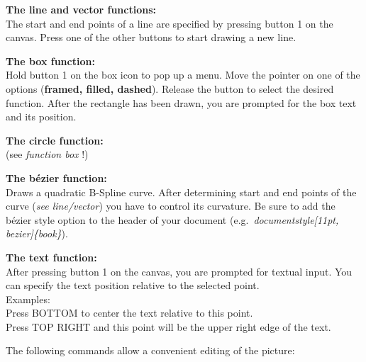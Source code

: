 \begin{description}
  \item{\bf The line and vector functions:} \\
     The start and end points of a line are specified by pressing
     button 1 on the canvas.
     Press one of the other buttons to start drawing a new line.
  \item{\bf The box function:} \\
     Hold button 1 on the box icon to pop up a menu.
     Move the pointer on one of the options ({\bf framed, filled,
     dashed}). Release the button to select the desired function.
     After the rectangle has been drawn, you are prompted for the
     box text and its position.

  \item{\bf The circle function:} \\
     (see {\it function box} !)

  \item{\bf The b\'{e}zier function:} \\
     Draws a quadratic B-Spline curve.
     After determining start and end points of the curve ({\it see line/vector}) 
     you have to control its curvature.
     Be sure to add the b\'{e}zier style option to the header of your document
     (e.g.~{\it documentstyle[11pt, bezier]\{book\}}).
     
  \item{\bf The text function:} \\
     After pressing button 1 on the canvas, you are prompted for
     textual input.
     You can specify the text position relative to the 
     selected point.\\
     Examples:\\
     Press BOTTOM to center the text relative to this point.\\
     Press TOP RIGHT and this point will be the upper right edge
     of the text.
\end{description}



The following commands allow a convenient editing of the
picture:


